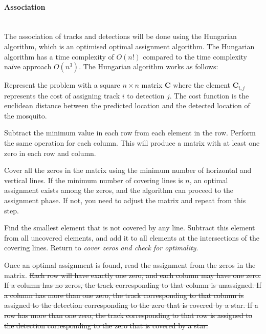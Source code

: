 \paragraph{Association}\mbox{}\\
The association of tracks and detections will be done using the Hungarian algorithm, which is an optimised optimal assignment algorithm. The Hungarian algorithm has a time complexity of $O\left(n!\right)$ compared to the time complexity na\"ive approach $O\left(n^3\right)$. The Hungarian algorithm works as follows:
\begin{description}[style=nextline]
  \item[Generate a cost matrix.] Represent the problem with a square $n \times n$ matrix $\mathbf{C}$ where the element $\mathbf{C}_{i,j}$ represents the cost of assigning track $i$ to detection $j$. The cost function is the euclidean distance between the predicted location and the detected location of the mosquito.
  \item[Row and column reduction.] Subtract the minimum value in each row from each element in the row. Perform the same operation for each column. This will produce a matrix with at least one zero in each row and column.
  \item[Cover zeros and check for optimality.] Cover all the zeros in the matrix using the minimum number of horizontal and vertical lines. If the minimum number of covering lines is $n$, an optimal assignment exists among the zeros, and the algorithm can proceed to the assignment phase. If not, you need to adjust the matrix and repeat from this step.
  \item[Adjust the matrix.] Find the smallest element that is not covered by any line. Subtract this element from all uncovered elements, and add it to all elements at the intersections of the covering lines. Return to \textit{cover zeros and check for optimality}.
  \item[Assignment.] Once an optimal assignment is found, read the assignment from the zeros in the matrix. \sout{Each row will have exactly one zero, and each column may have one zero. If a column has no zeros, the track corresponding to that column is unassigned. If a column has more than one zero, the track corresponding to that column is assigned to the detection corresponding to the zero that is covered by a star. If a row has more than one zero, the track corresponding to that row is assigned to the detection corresponding to the zero that is covered by a star.}
\end{description}



